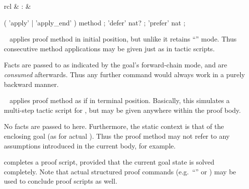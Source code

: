 \begin{isabellebody}
\begin{isamarkuptext}
\begin{matharray}{rcl}
    \hypertarget{command.back}{\hyperlink{command.back}{\mbox{}}}\isa{{\isachardoublequote}\isactrlsup {\isacharasterisk}{\isachardoublequote}} & : &  \\
  \end{matharray}

  \begin{rail}
    ( 'apply' | 'apply_end' ) method
    ;
    'defer' nat?
    ;
    'prefer' nat
    ;
  \end{rail}

  \begin{description}

  \item \hyperlink{command.apply}{\mbox{}}~ applies proof method  in
  initial position, but unlike \hyperlink{command.proof}{\mbox{}} it retains ``'' mode.  Thus consecutive method applications may be
  given just as in tactic scripts.
  
  Facts are passed to  as indicated by the goal's
  forward-chain mode, and are \emph{consumed} afterwards.  Thus any
  further \hyperlink{command.apply}{\mbox{}} command would always work in a purely
  backward manner.
  
  \item \hyperlink{command.apply-end}{\mbox{}}~ applies proof method  as if in terminal position.  Basically, this simulates a
  multi-step tactic script for \hyperlink{command.qed}{\mbox{}}, but may be given
  anywhere within the proof body.
  
  No facts are passed to  here.  Furthermore, the static
  context is that of the enclosing goal (as for actual \hyperlink{command.qed}{\mbox{}}).  Thus the proof method may not refer to any assumptions
  introduced in the current body, for example.
  
  \item \hyperlink{command.done}{\mbox{}} completes a proof script, provided that the
  current goal state is solved completely.  Note that actual
  structured proof commands (e.g.\ ``\hyperlink{command.dot}{\mbox{\isa{\isacommand{{\isachardot}}}}}'' or \hyperlink{command.sorry}{\mbox{}}) may be used to conclude proof scripts as well.


\end{description}
\end{isamarkuptext}
\end{isabellebody}
